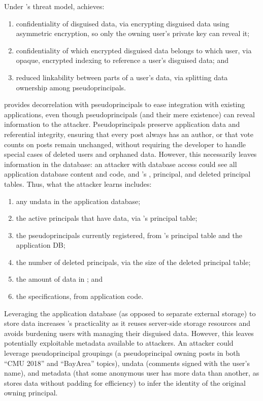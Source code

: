%
Under \sys's threat model, \sys achieves:
\begin{enumerate}[nosep]
    \item confidentiality of disguised data, via encrypting disguised data using asymmetric encryption, so only the owning user’s private key can reveal it;
    \item confidentiality of which encrypted disguised data belongs to which
        user, via opaque, encrypted indexing to reference a user’s disguised data; and
    \item reduced linkability between parts of a user's data, via splitting data ownership among pseudoprincipals.
\end{enumerate}
%
\sys provides decorrelation with pseudoprincipals to ease integration with
existing applications, even though pseudoprincipals (and their mere existence)
can reveal information to the attacker.
%
Pseudoprincipals preserve application data and referential integrity, ensuring
that \eg every post always has an author, or that vote counts on posts remain
unchanged, without requiring the developer to handle special cases of deleted
users and orphaned data.
%
However, this necessarily leaves information in the database: an attacker with
database access could see all application database content and code, and \sys's
\xx, principal, and deleted principal tables.
%
Thus, what the attacker learns includes:
\begin{enumerate}[nosep]
  \item any un\xxed data in the application database;
  \item the active principals that have \xxed data, via \sys's principal
      table;
  \item the pseudoprincipals currently registered, from \sys's
    principal table and the application DB;
  \item the number of deleted principals, via the size of the deleted
    principal table;
  \item the amount of \xxed data in \sys; and
  \item the \xx specifications, from application code.
\end{enumerate}

%


Leveraging the application database (as opposed to separate external storage) to
store \xxed data increases \sys's practicality as it reuses server-side storage
resources  and avoids burdening users with managing their disguised data.
However, this leaves potentially exploitable metadata available to attackers.
%
An attacker could leverage pseudoprincipal groupings (\eg a pseudoprincipal
owning posts in both ``CMU 2018'' and ``BayArea'' topics), un\xxed data
(\eg comments signed with the user's name), and \sys metadata (\eg that some
anonymous user has more \xxed data than another, as \sys stores \xxed data without
padding for efficiency) to infer the identity of the original owning principal.

